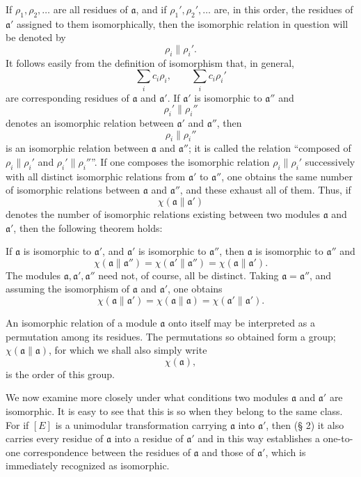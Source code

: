 \documentclass[11pt,a4paper]{article}
\begin{document}
If $\rho_1,\rho_2,\ldots$ are all residues of $\mathfrak a$, and if $\rho_1',\rho_2',\ldots$ are, in this order, the residues of $\mathfrak a'$ assigned to them isomorphically, then the isomorphic relation in question will be denoted by
\[
 \rho_i\parallel \rho_i'.
\]
It follows easily from the definition of isomorphism that, in general,
\[
 \sum_i c_i\rho_i,
 \qquad
 \sum_i c_i\rho_i'
\]
are corresponding residues of $\mathfrak a$ and $\mathfrak a'$. If $\mathfrak a'$ is isomorphic to $\mathfrak a''$ and
\[
 \rho_i'\parallel \rho_i''
\]
denotes an isomorphic relation between $\mathfrak a'$ and $\mathfrak a''$, then
\[
 \rho_i\parallel \rho_i''
\]
is an isomorphic relation between $\mathfrak a$ and $\mathfrak a''$; it is called the relation ``composed of $\rho_i\parallel\rho_i'$ and $\rho_i'\parallel\rho_i''$''. If one composes the isomorphic relation $\rho_i\parallel\rho_i'$ successively with all distinct isomorphic relations from $\mathfrak a'$ to $\mathfrak a''$, one obtains the same number of isomorphic relations between $\mathfrak a$ and $\mathfrak a''$, and these exhaust all of them. Thus, if
\[
 \chi(\mathfrak a\parallel\mathfrak a')
\]
denotes the number of isomorphic relations existing between two modules $\mathfrak a$ and $\mathfrak a'$, then the following theorem holds:

If $\mathfrak a$ is isomorphic to $\mathfrak a'$, and $\mathfrak a'$ is isomorphic to $\mathfrak a''$, then $\mathfrak a$ is isomorphic to $\mathfrak a''$ and
\[
 \chi(\mathfrak a\parallel\mathfrak a'')=
 \chi(\mathfrak a'\parallel\mathfrak a'')=
 \chi(\mathfrak a\parallel\mathfrak a').
\]
The modules $\mathfrak a,\mathfrak a',\mathfrak a''$ need not, of course, all be distinct. Taking $\mathfrak a=\mathfrak a''$, and assuming the isomorphism of $\mathfrak a$ and $\mathfrak a'$, one obtains
\[
 \chi(\mathfrak a\parallel\mathfrak a')=
 \chi(\mathfrak a\parallel\mathfrak a)=
 \chi(\mathfrak a'\parallel\mathfrak a').
\]

An isomorphic relation of a module $\mathfrak a$ onto itself may be interpreted as a permutation among its residues. The permutations so obtained form a group; $\chi(\mathfrak a\parallel\mathfrak a)$, for which we shall also simply write
\[
 \chi(\mathfrak a),
\]
is the order of this group.

We now examine more closely under what conditions two modules $\mathfrak a$ and $\mathfrak a'$ are isomorphic. It is easy to see that this is so when they belong to the same class. For if $[E]$ is a unimodular transformation carrying $\mathfrak a$ into $\mathfrak a'$, then (§ 2) it also carries every residue of $\mathfrak a$ into a residue of $\mathfrak a'$ and in this way establishes a one-to-one correspondence between the residues of $\mathfrak a$ and those of $\mathfrak a'$, which is immediately recognized as isomorphic.
\end{document}
